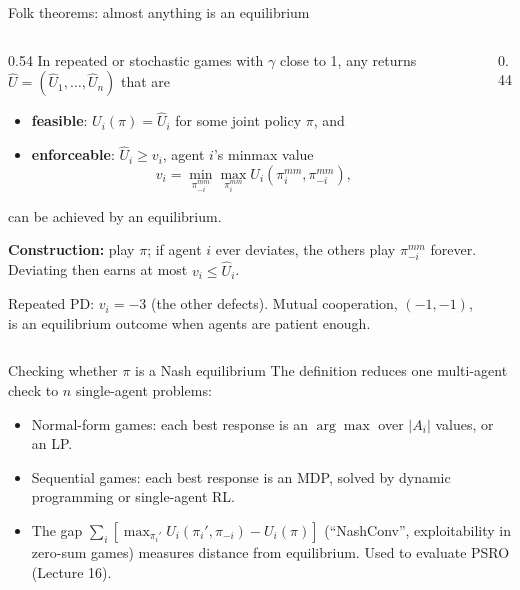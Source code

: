 \documentclass[aspectratio=169,11pt]{beamer}
\begin{document}
\begin{frame}{Folk theorems: almost anything is an equilibrium}
  \begin{columns}[c]
    \begin{column}{0.54\textwidth}
      \small
      In repeated or stochastic games with $\gamma$ close to 1, any returns $\hat U = (\hat U_1, \dots, \hat U_n)$ that are
      \begin{itemize}
        \item \textbf{feasible}: $U_i(\pi) = \hat U_i$ for some joint policy $\pi$, and
        \item \textbf{enforceable}: $\hat U_i \ge v_i$, agent $i$'s minmax value
          \[
            v_i = \min_{\pi_{-i}^{mm}} \max_{\pi_i^{mm}} U_i(\pi_i^{mm}, \pi_{-i}^{mm}),
          \]
      \end{itemize}
      can be achieved by an equilibrium.
      \medskip

      \textbf{Construction:} play $\pi$; if agent $i$ ever deviates, the others play $\pi_{-i}^{mm}$ forever. Deviating then earns at most $v_i \le \hat U_i$.
      \medskip

      Repeated PD: $v_i = -3$ (the other defects). Mutual cooperation, $(-1,-1)$, is an equilibrium outcome when agents are patient enough.
    \end{column}
    \begin{column}{0.44\textwidth}
      \centering
      
    \end{column}
  \end{columns}
\end{frame}

\begin{frame}{Checking whether $\pi$ is a Nash equilibrium}
  The definition reduces one multi-agent check to $n$ single-agent problems:
  \bigskip

  \centering
  
  \bigskip

  \raggedright
  \begin{itemize}
    \item Normal-form games: each best response is an $\arg\max$ over $|A_i|$ values, or an LP.
    \item Sequential games: each best response is an MDP, solved by dynamic programming or single-agent RL.
    \item The gap $\sum_i [\max_{\pi_i'} U_i(\pi_i', \pi_{-i}) - U_i(\pi)]$ (``NashConv'', exploitability in zero-sum games) measures distance from equilibrium. Used to evaluate PSRO (Lecture 16).
  \end{itemize}
\end{frame}
\end{document}
